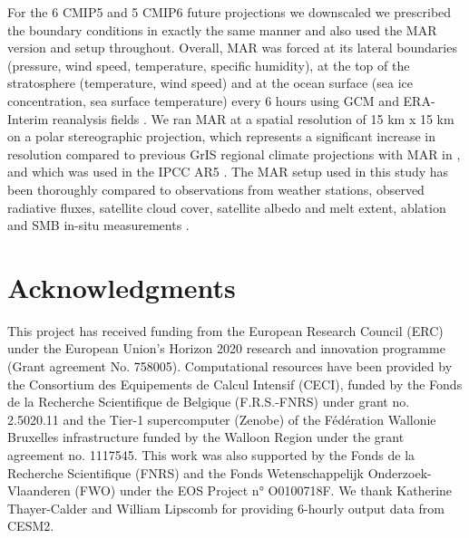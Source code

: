 \documentclass[12pt]{article}
\begin{document}
For the 6 CMIP5 and 5 CMIP6 future projections we downscaled we prescribed the boundary conditions in exactly the same manner and also used the MAR version and setup throughout. Overall, MAR was forced at its lateral boundaries (pressure, wind speed, temperature, specific humidity), at the top of the stratosphere (temperature, wind speed) and at the ocean surface (sea ice concentration, sea surface temperature) every 6 hours using GCM and ERA-Interim reanalysis fields \cite{Agosta2019,Kittel2018,Fettweis2007,Fettweis2013}. We ran MAR at a spatial resolution of 15 km x 15 km on a polar stereographic projection, which represents a significant increase in resolution compared to previous GrIS regional climate projections with MAR in \textcite{Fettweis2013}, and which was used in the IPCC AR5 \cite{IPCC2014}. The MAR setup used in this study has been thoroughly compared to observations from weather stations, observed radiative fluxes, satellite cloud cover, satellite albedo and melt extent, ablation and SMB in-situ measurements \cite{Tedesco2019,Fettweis2007,Fettweis2017,Hofer2017,Delhasse2019}. 





\nolinenumbers
\cleardoublepage
\printbibliography[keyword=methods, title={Methods References}]



\section*{Acknowledgments}
This project has received funding from the European Research Council (ERC) under the European Union’s Horizon 2020 research and innovation programme (Grant agreement No. 758005). Computational resources have been provided by the Consortium des Equipements de Calcul Intensif (CECI), funded by the Fonds de la Recherche Scientifique de Belgique (F.R.S.-FNRS) under grant no. 2.5020.11 and the Tier-1 supercomputer (Zenobe) of the Fédération Wallonie Bruxelles infrastructure funded by the Walloon Region under the grant agreement no. 1117545. This work was also supported by the Fonds de la Recherche Scientifique (FNRS) and the Fonds Wetenschappelijk Onderzoek-Vlaanderen (FWO) under the EOS Project n° O0100718F. 
We thank Katherine Thayer-Calder and William Lipscomb for providing 6-hourly output data from CESM2.
\end{document}
